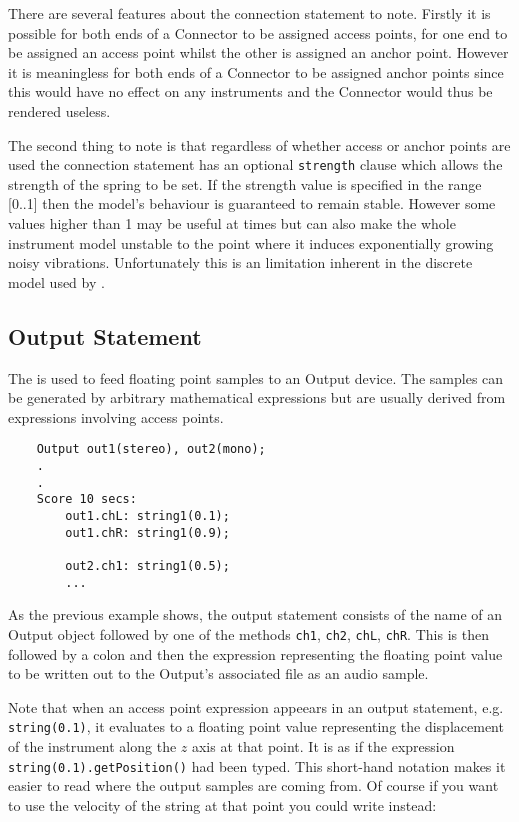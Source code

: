 There are several features about the connection statement to note. Firstly
it is possible for both ends of a Connector to be assigned
access points, for one end to be assigned an access point whilst the other 
is assigned an anchor point. However it is meaningless for both ends of a 
Connector to be assigned anchor points since this would have
no effect on any instruments and the Connector would thus be
rendered useless.

The second thing to note is that regardless of whether access or anchor
points are used the connection statement has an optional \verb|strength|
clause which allows the strength of the spring to be set. If the strength
value is specified in the range [0..1] then the model's behaviour is
guaranteed to remain stable. However some values higher than 1 may be
useful at times but can also make the whole instrument model unstable
to the point where it induces exponentially growing noisy vibrations.
Unfortunately this is an limitation inherent in the discrete model used
by \tao.

\subsection{Output Statement}
\label{section:output_statement}
The  is used to feed floating point samples to
an Output device. The samples can be generated by arbitrary
mathematical expressions but are usually derived from expressions
involving access points.

\begin{verbatim}
    Output out1(stereo), out2(mono);
    .
    .
    Score 10 secs:
        out1.chL: string1(0.1);
        out1.chR: string1(0.9);
    
        out2.ch1: string1(0.5);
        ...
\end{verbatim}

As the previous example shows, the output statement consists of the
name of an Output object followed by one of the methods \verb|ch1|,
\verb|ch2|, \verb|chL|, \verb|chR|. This is then followed by
a colon and then the expression representing the floating point value
to be written out to the Output's associated file as an audio sample.

Note that when an access point expression appeears in an output
statement, e.g. \verb|string(0.1)|, it evaluates to a floating point
value representing the displacement of the instrument along the 
$z$ axis at that point. It is as if the expression
\verb|string(0.1).getPosition()| had been typed. This short-hand
notation makes it easier to read where the output samples are
coming from. Of course if you want to use the velocity of the
string at that point you could write instead:

